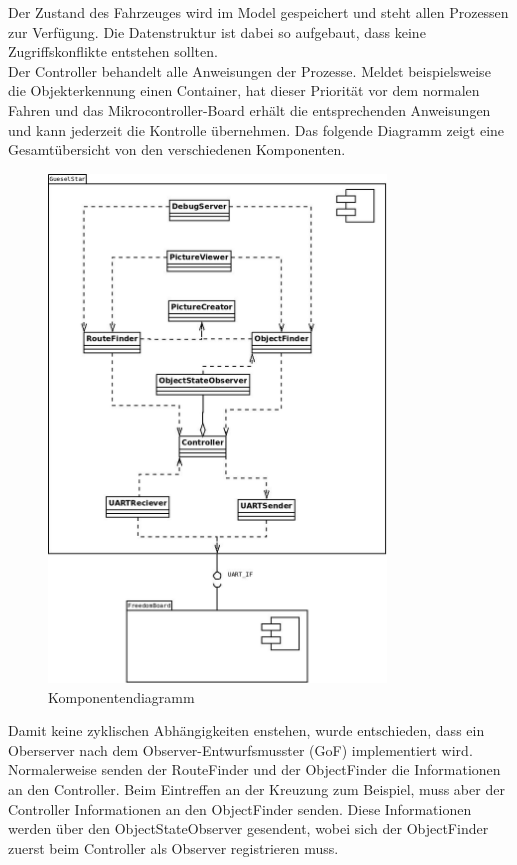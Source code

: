 Der Zustand des Fahrzeuges wird im Model gespeichert und steht allen Prozessen zur Verfügung. Die Datenstruktur ist dabei so aufgebaut, dass keine Zugriffskonflikte entstehen sollten.\\
Der Controller behandelt alle Anweisungen der Prozesse. Meldet beispielsweise die Objekterkennung einen Container, hat dieser Priorität vor dem normalen Fahren und das Mikrocontroller-Board erhält die entsprechenden Anweisungen und kann jederzeit die Kontrolle übernehmen. Das folgende Diagramm zeigt eine Gesamtübersicht von den verschiedenen Komponenten.\\[0.2cm]
\begin{figure}[H]
\centering
\includegraphics[width=0.8\textwidth]{03_Loesungskonzept/pictures/Komponentendiagramm_detailliert_v2.jpeg}
\caption{Komponentendiagramm}
\end{figure}
Damit keine zyklischen Abhängigkeiten enstehen, wurde entschieden, dass ein Oberserver nach dem Observer-Entwurfsmusster (GoF) implementiert wird. Normalerweise senden der RouteFinder und der ObjectFinder die Informationen an den Controller. Beim Eintreffen an der Kreuzung zum Beispiel, muss aber der Controller Informationen an den ObjectFinder senden. Diese Informationen werden über den ObjectStateObserver gesendent, wobei sich der ObjectFinder zuerst beim Controller als Observer registrieren muss.
